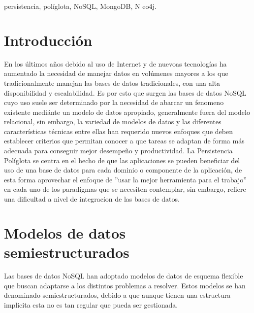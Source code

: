 \documentclass[conference]{IEEEtran}
\begin{document}
\begin{IEEEkeywords}
persistencia, pol\'iglota, NoSQL, MongoDB, N	eo4j.
\end{IEEEkeywords}


\IEEEpeerreviewmaketitle


\section{Introducci\'on}
En los \'ultimos a\~nos debido al uso de Internet y de nuevoas tecnolog\'ias ha aumentado la necesidad de manejar datos en vol\'umenes mayores a los que tradicionalmente manejan las bases de datos tradicionales, con 	una alta disponibilidad y escalabilidad. Es por esto que surgen las bases de datos NoSQL cuyo uso suele ser determinado por la necesidad de abarcar un fenomeno existente medi\'ante un modelo de datos apropiado, generalmente fuera del modelo relacional, sin embargo, la variedad de modelos de datos y las diferentes características t\'ecnicas entre ellas han requerido nuevos enfoques que deben establecer criterios que permitan conocer a que tareas se adaptan de forma m\'as adecuada para conseguir mejor desempe\~no y productividad.  La Persistencia Pol\'iglota se centra en el hecho de que las aplicaciones se pueden beneficiar del uso de una base de datos para cada dominio o componente de la aplicaci\'on, de esta forma aprovechar el enfoque de ”usar la mejor herramienta para el trabajo” en cada uno de los paradigmas que se necesiten contemplar, sin embargo, refiere una dificultad a nivel de integracion de las bases de datos.

\section{Modelos de datos semiestructurados}

Las bases de datos NoSQL han adoptado modelos de datos de esquema flexible que buscan adaptarse a los distintos problemas a resolver. Estos modelos se han denominado semiestructurados, debido a que aunque tienen una estructura implicita esta no es tan regular que pueda ser gestionada. 
\end{document}
